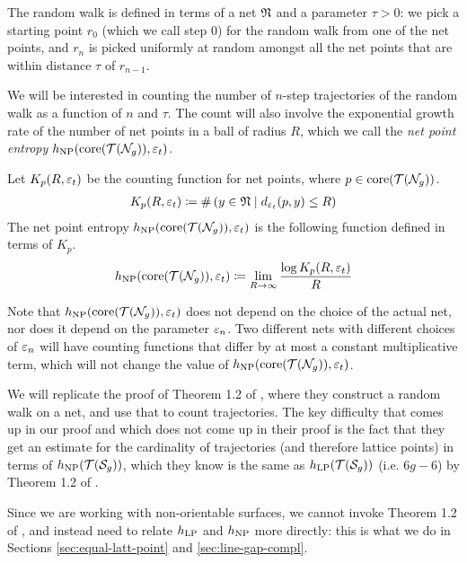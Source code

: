 The random walk is defined in terms of a net $\mathfrak{N}$ and a parameter $\tau > 0$: we pick a starting point $r_0$ (which we call step $0$) for the random walk from one of the net points, and $r_n$ is picked uniformly at random amongst all the net points that are within distance $\tau$ of $r_{n-1}$.

We will be interested in counting the number of $n$-step trajectories of the random walk as a function of $n$ and $\tau$.
The count will also involve the exponential growth rate of the number of net points in a ball of radius $R$, which we call the \emph{net point entropy} $h_{\mathrm{NP}}(\mathrm{core}(\mathcal{T}(\mathcal{N}_g)), \varepsilon_t)$.

\begin{definition}
  Let $K_p(R, \varepsilon_t)$ be the counting function for net points, where $p \in \mathrm{core}(\mathcal{T}(\mathcal{N}_g))$.
  \begin{align*}
    K_p(R, \varepsilon_t) \coloneqq \#\left( y \in \mathfrak{N} \mid d_{\varepsilon_t}(p, y) \leq R \right)
  \end{align*}
  The net point entropy $h_{\mathrm{NP}}(\mathrm{core}(\mathcal{T}(\mathcal{N}_g)), \varepsilon_t)$ is the following function defined in terms of $K_p$.
  \begin{align*}
    h_{\mathrm{NP}}(\mathrm{core}(\mathcal{T}(\mathcal{N}_g)), \varepsilon_t) \coloneqq \lim_{R \to \infty} \frac{\log K_p(R, \varepsilon_t)}{R}
  \end{align*}
\end{definition}

Note that $h_{\mathrm{NP}}(\mathrm{core}(\mathcal{T}(\mathcal{N}_g)), \varepsilon_t)$ does not depend on the choice of the actual net, nor does it depend on the parameter $\varepsilon_n$. Two different nets with different choices of $\varepsilon_n$ will have counting functions that differ by at most a constant multiplicative term, which will not change the value of $h_{\mathrm{NP}}(\mathrm{core}(\mathcal{T}(\mathcal{N}_g)), \varepsilon_t)$.

We will replicate the proof of Theorem 1.2 of \textcite{eskinmirzakhani}, where they construct a random walk on a net, and use that to count \concave trajectories.
The key difficulty that comes up in our proof and which does not come up in their proof is the fact that they get an estimate for the cardinality of \concave trajectories (and therefore \concave lattice points) in terms of $h_{\mathrm{NP}}(\mathcal{T}(\mathcal{S}_g))$, which they know is the same as $h_{\mathrm{LP}}(\mathcal{T}(\mathcal{S}_g))$ (i.e. $6g-6$) by Theorem 1.2 of \textcite{10.1215/00127094-1548443}.

Since we are working with non-orientable surfaces, we cannot invoke Theorem 1.2 of \textcite{10.1215/00127094-1548443}, and instead need to relate $h_{\mathrm{LP}}$ and $h_{\mathrm{NP}}$ more directly: this is what we do in Sections \ref{sec:equal-latt-point} and \ref{sec:line-gap-compl}.

